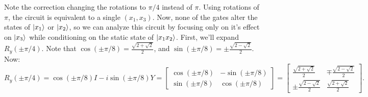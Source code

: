 \Soln Note the correction changing the rotations to $\pi/4$ instead of $\pi$.  Using rotations of $\pi$, the circuit is equivalent to a single \CNOT$(x_1, x_3)$.  Now, none of the gates alter the states of $\ket{x_1}$ or $\ket{x_2}$, so we can analyze this circuit by focusing only on it's effect on $\ket{x_3}$ while conditioning on the static state of $\ket{x_1x_2}$. First, we'll expand $R_y(\pm\pi/4)$.  Note that $\cos(\pm\pi/8) = \frac{\sqrt{2+\sqrt{2}}}{2}$, and $\sin(\pm\pi/8)=\pm\frac{\sqrt{2-\sqrt{2}}}{2}$.  Now:
$$R_y(\pm\pi/4) = \cos(\pm\pi/8)I-i\sin(\pm\pi/8)Y = \begin{bmatrix}\cos(\pm\pi/8) & -\sin(\pm\pi/8) \\ \sin(\pm\pi/8)& \cos(\pm\pi/8)\end{bmatrix} = \begin{bmatrix} \frac{\sqrt{2+\sqrt{2}}}{2} & \mp\frac{\sqrt{2-\sqrt{2}}}{2} \\ \pm\frac{\sqrt{2-\sqrt{2}}}{2} & \frac{\sqrt{2+\sqrt{2}}}{2}\end{bmatrix}.$$

